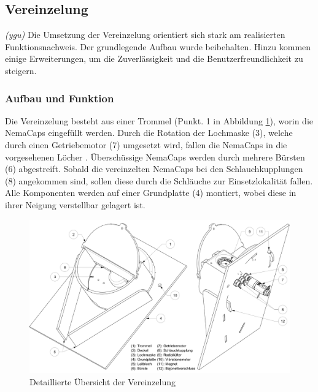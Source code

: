 \subsection{Vereinzelung} 
\label{sec:Vereinzelung}
\textit{(ygu)} Die Umsetzung der Vereinzelung orientiert sich stark am realisierten Funktionsnachweis. Der grundlegende Aufbau wurde beibehalten. Hinzu kommen einige Erweiterungen, um die Zuverlässigkeit und die Benutzerfreundlichkeit zu steigern.

\subsubsection{Aufbau und Funktion}
Die Vereinzelung besteht aus einer Trommel (Punkt. 1 in Abbildung \ref{fig:details_vereinzelung}), worin die NemaCaps eingefüllt werden. Durch die Rotation der Lochmaske (3), welche durch einen Getriebemotor (7) umgesetzt wird, fallen die NemaCaps in die vorgesehenen Löcher . Überschüssige NemaCaps werden durch mehrere Bürsten (6) abgestreift. Sobald die vereinzelten NemaCaps bei den Schlauchkupplungen (8) angekommen sind, sollen diese durch die Schläuche zur Einsetzlokalität fallen. Alle Komponenten werden auf einer Grundplatte (4) montiert, wobei diese in ihrer Neigung verstellbar gelagert ist.
	\begin{figure}[H]
	\includegraphics[scale=0.455]{Illustrationen/6-Umsetzung/details_vereinzelung.jpg}
	\caption{Detaillierte Übersicht der Vereinzelung}
	\label{fig:details_vereinzelung}
	\end{figure}

